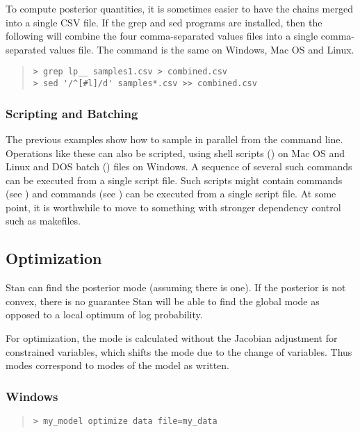 To compute posterior quantities, it is sometimes easier to have the
chains merged into a single CSV file.  If the grep and sed programs
are installed, then the following will combine the four
comma-separated values files into a single comma-separated values
file.  The command is the same on Windows, Mac OS and Linux.
%
\begin{quote}
\begin{Verbatim}[fontshape=sl]
> grep lp__ samples1.csv > combined.csv
> sed '/^[#l]/d' samples*.csv >> combined.csv 
\end{Verbatim}
\end{quote}

\subsubsection{Scripting and Batching}

The previous examples show how to sample in parallel from the command
line.  Operations like these can also be scripted, using shell scripts
() on Mac OS and Linux and DOS batch () files on
Windows.  A sequence of several such commands can be executed from a
single script file.  Such scripts might contain  commands
(see ) and  commands (see
) can be executed from a single script
file.  At some point, it is worthwhile to move to something with
stronger dependency control such as makefiles.


\subsection{Optimization}

Stan can find the posterior mode (assuming there is one).  If the
posterior is not convex, there is no guarantee Stan will be able to
find the global mode as opposed to a local optimum of log probability.

For optimization, the mode is calculated without the Jacobian
adjustment for constrained variables, which shifts the mode due to the
change of variables.  Thus modes correspond to modes of the model as
written.  

\subsubsection{Windows}
%
\begin{quote}
\begin{Verbatim}[fontshape=sl]
> my_model optimize data file=my_data
\end{Verbatim}
\end{quote}

